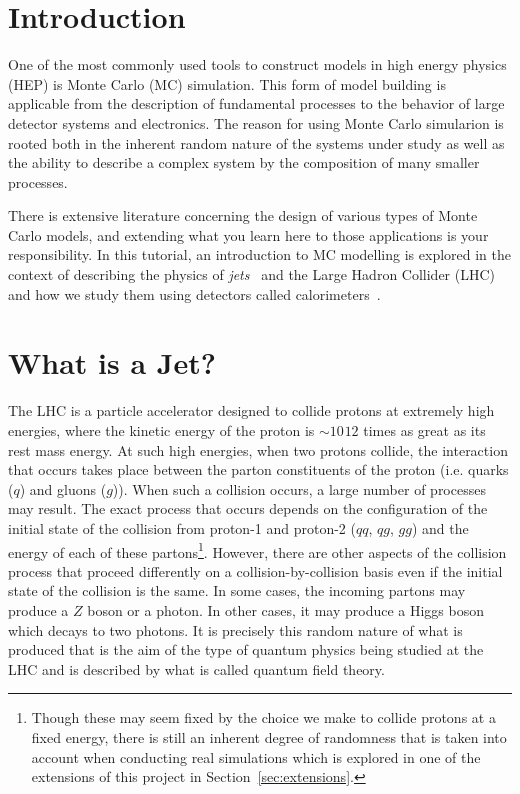 \documentclass[UKenglish,texlive=2016]{\ATLASLATEXPATH atlasdoc}
\begin{document}
\maketitle



\section{Introduction}
One of the most commonly used tools to construct models in high energy physics (HEP) is Monte Carlo (MC) simulation.  
This form of model building is applicable from the description of fundamental processes to the behavior of large detector systems and electronics.  The reason for using Monte Carlo simularion is rooted both in the inherent random nature of the systems under study as well as the ability to describe a complex system by the composition of many smaller processes.  

There is extensive literature concerning the design of various types of Monte Carlo models, and extending what you learn here to those applications is your responsibility.  In this tutorial, an introduction to MC modelling is explored in the context of describing the physics of \textit{jets}~\cite{Ellis:1276292,Ellis:2007ib} and the Large Hadron Collider (LHC)~\cite{Evans:2008zzb} and how we study them using detectors called calorimeters~\cite{Proudfoot:2006tr}.



\section{What is a Jet?}
\label{sec:whatisjet}
The LHC is a particle accelerator designed to collide protons at extremely high energies, where the kinetic energy of the proton is $\sim10^{}12$ times as great as its rest mass energy.  At such high energies, when two protons collide, the interaction that occurs takes place between the parton constituents of the proton (i.e. quarks ($q$) and gluons ($g$)).  When such a collision occurs, a large number of processes may result.  The exact process that occurs depends on the configuration of the initial state of the collision from proton-1 and proton-2 ($qq$, $qg$, $gg$) and the energy of each of these partons\footnote{Though these may seem fixed by the choice we make to collide protons at a fixed energy, there is still an inherent degree of randomness that is taken into account when conducting real simulations which is explored in one of the extensions of this project in Section~\ref{sec:extensions}.}.  However, there are other aspects of the collision process that proceed differently on a collision-by-collision basis even if the initial state of the collision is the same.  In some cases, the incoming partons may produce a $Z$ boson or a photon.  In other cases, it may produce a Higgs boson which decays to two photons.  It is precisely this random nature of what is produced that is the aim of the type of quantum physics being studied at the LHC and is described by what is called quantum field theory.  
\end{document}

